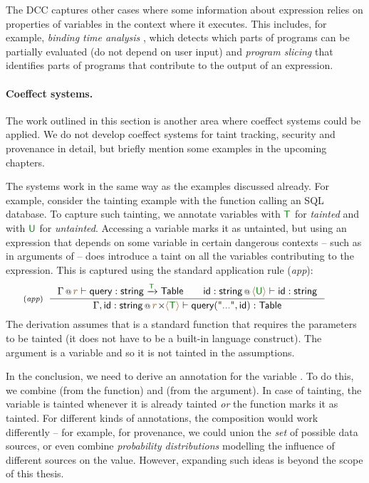 The DCC captures other cases where some information about expression relies on properties of variables
in the context where it executes.  This includes, for example, \emph{binding time analysis}
\cite{app-binding-time-analysis}, which detects which parts of programs can be partially evaluated
(do not depend on user input) and \emph{program slicing} \cite{app-slicing-survey} that identifies
parts of programs that contribute to the output of an expression.

\paragraph{Coeffect systems.}
The work outlined in this section is another area where coeffect systems could be applied.
We do not develop coeffect systems for taint tracking, security and provenance in detail,
but briefly mention some examples in the upcoming chapters.

The systems work in the same way as the examples discussed already. For example, consider the
tainting example with the  function calling an SQL database. To capture such
tainting, we annotate variables with $\cclrd{\ident{T}}$ for \emph{tainted} and with
$\cclrd{\ident{U}}$ for \emph{untainted}. Accessing a variable marks it as untainted,
but using an expression that depends on some variable in certain dangerous contexts -- such
as in arguments of  -- does introduce a taint on all the variables contributing to
the expression. This is captured using the standard application rule (\emph{app}):
%
\begin{equation*}
\hspace{-2em}
\tyrule{app}
  { \coctx{\Gamma}{\aclrd{r}} \vdash \ident{query} : \ident{string} \xrightarrow{\cclrd{\ident{T}}} \ident{Table} \qquad
    \coctx{\ident{id}:\ident{string}}{ \alift{\cclrd{\ident{U}}}} \vdash \ident{id} : \ident{string} }
  { \coctx{\Gamma, \ident{id}:\ident{string}}{ \aclrd{r} \cons \alift {\cclrd{\ident{T}}} \vdash \ident{query}(\str{...}, \ident{id}) : \ident{Table} } }
\end{equation*}
%
The derivation assumes that  is a standard function that requires the parameters
to be tainted (it does not have to be a built-in language construct). The argument is a
variable and so it is not tainted in the assumptions.

In the conclusion, we need to derive an annotation for the variable . To do this, we
combine  (from the function) and  (from the argument). In case
of tainting, the variable is tainted whenever it is already tainted \emph{or} the function marks
it as tainted. For different kinds of annotations, the composition would work differently -- for
example, for provenance, we could union the \emph{set} of possible data sources, or even combine
\emph{probability distributions} modelling the influence of different sources on the value.
However, expanding such ideas is beyond the scope of this thesis.

